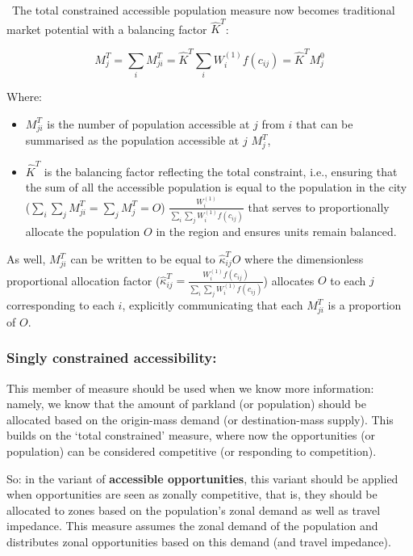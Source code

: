\documentclass[
11pt, %
oneside, %
english, %
singlespacing, %
]{macthesis} %
\def\tightlist{}
\begin{document}
~The total constrained accessible population measure now becomes traditional market potential with a balancing factor \(\hat K^T\):

\begin{equation}
\label{eq:total-constrained-market-park}
M^T_{j} = \sum_i M^T_{ji} = \hat K^T \sum_i W_i^{(1)} f(c_{ij}) = \hat K^T M_{j}^0
\end{equation} 

Where:

\begin{itemize}
\tightlist
\item
  \(M^T_{ji}\) is the number of population accessible at \(j\) from \(i\) that can be summarised as the population accessible at \(j\) \(M^T_{j}\),
\item
  \(\hat K^T\) is the balancing factor reflecting the total constraint, i.e., ensuring that the sum of all the accessible population is equal to the population in the city (\(\sum_i\sum_j M^T_{ji} = \sum_j M^T_{j} = O\)) \(\frac{W^{(1)}_i}{\sum_i\sum_j W^{(1)}_if(c_{ij})}\) that serves to proportionally allocate the population \(O\) in the region and ensures units remain balanced.
\end{itemize}

As well, \(M^T_{ji}\) can be written to be equal to \(\hat\kappa_{ij}^T O\) where the dimensionless proportional allocation factor (\(\hat \kappa_{ij}^T = \frac{W_i^{(1)} f(c_{ij})}{\sum_i\sum_j W^{(1)}_i f(c_{ij})}\)) allocates \(O\) to each \(j\) corresponding to each \(i\), explicitly communicating that each \(M^T_{ji}\) is a proportion of \(O\).

\subsubsection{Singly constrained accessibility:}\label{singly-constrained-accessibility-1}

This member of measure should be used when we know more information: namely, we know that the amount of parkland (or population) should be allocated based on the origin-mass demand (or destination-mass supply). This builds on the `total constrained' measure, where now the opportunities (or population) can be considered competitive (or responding to competition).

So: in the variant of \textbf{accessible opportunities}, this variant should be applied when opportunities are seen as zonally competitive, that is, they should be allocated to zones based on the population's zonal demand as well as travel impedance. This measure assumes the zonal demand of the population and distributes zonal opportunities based on this demand (and travel impedance).
\end{document}
